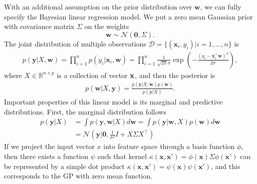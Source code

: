 \documentclass{article} %
\theoremstyle{definition}
\newcommand\mb{\mathbf}
\newcommand\mc{\mathcal}
\begin{document}
With an additional assumption on the prior distribution over $\mb{w}$, we can fully specify the Bayesian linear regression model. We put a zero mean Gaussian prior with covariance matrix $\Sigma$ on the weights
\begin{equation}
\mb{w} \sim \mc{N}(\mb{0}, \Sigma).
\end{equation}
The joint distribution of multiple observations $\mc{D} = \{(\mb{x}_i, y_i)|i=1,...,n\}$ is
\begin{align}
p(\mb{y}|X, \mb{w}) = \prod_{i=1}^{n} p(y_i|\mb{x}_i, \mb{w}) = \prod_{i=1}^{n} \frac{1}{\sqrt{2\pi}\sigma}\exp(-\frac{(y_i - \mb{x}_i^\top \mb{w})^2 }{2\sigma}),
\end{align}
where $X \in \mathbb{R}^{n \times p}$ is a collection of vector $\bf x$, and then the posterior is
\begin{align}
p(\mb{w}|X, \mb{y}) = \frac{p(\mb{y}|X,\mb{w})p(\mb{w})}{p(\mb{y}|X)}.
\end{align}
Important properties of this linear model is its marginal and predictive distributions. First, the marginal distribution follows
\begin{align}
p(\mb{y}|X) & = \int p(\mb{y}, \mb{w}|X) d\mb{w} = \int p(\mb{y} | \mb{w}, X) p(\mb{w}) d\mb{w} \\
& =  \mc{N}(\mb{y} | \mb{0}, \frac{1}{\sigma^{2}}I + X\Sigma X^\top)
\end{align}
If we project the input vector $x$ into feature space through a basis function $\phi$, then there exists a function $\psi$ such that kernel $\kappa(\mb{x}, \mb{x}') = \phi(\mb{x})\Sigma\phi(\mb{x}')$ can be represented by a simple dot product $\kappa(\mb{x}, \mb{x}') = \psi(\mb{x})\psi(\mb{x}')$, and this corresponds to the GP with zero mean function.
\end{document}
